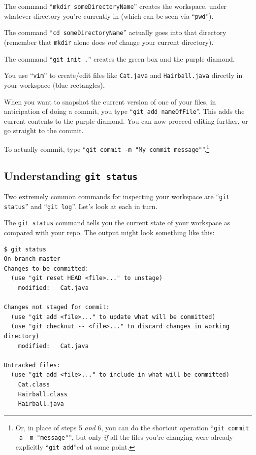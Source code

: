 \begin{compactenum}
\item The command ``\texttt{mkdir someDirectoryName}'' creates the workspace,
under whatever directory you're currently in (which can be seen via
``\texttt{pwd}'').
\item The command ``\texttt{cd someDirectoryName}'' actually goes into that
directory (remember that \texttt{mkdir} alone does \textit{not} change your
current directory).
\item The command ``\texttt{git init .}'' creates the green box and the purple
diamond.
\item You use ``\texttt{vim}'' to create/edit files like \texttt{Cat.java} and
\texttt{Hairball.java} directly in your workspace (blue rectangles).
\item When you want to snapshot the current version of one of your files, in
anticipation of doing a commit, you type ``\texttt{git add nameOfFile}''. This
adds the current contents to the purple diamond. You can now proceed editing
further, or go straight to the commit.

\item To actually commit, type ``\texttt{git commit -m "My commit
message"}''.\footnote{Or, in place of steps 5 \textit{and} 6, you can do the
shortcut operation ``\texttt{git commit -a -m "message"}'', but only
\textit{if} all the files you're changing were already explicitly
``\texttt{git add}''ed at some point.}

\end{compactenum}

\subsection{Understanding \texttt{git status}}

Two extremely common commands for inspecting your workspace are ``\texttt{git
status}'' and ``\texttt{git log}''. Let's look at each in turn.

The \texttt{git status} command tells you the current state of your workspace
as compared with your repo. The output might look something like this:

\begin{Verbatim}[fontsize=\scriptsize,samepage=true,frame=single]
$ git status
On branch master
Changes to be committed:
  (use "git reset HEAD <file>..." to unstage)
    modified:   Cat.java

Changes not staged for commit:
  (use "git add <file>..." to update what will be committed)
  (use "git checkout -- <file>..." to discard changes in working directory)
    modified:   Cat.java

Untracked files:
  (use "git add <file>..." to include in what will be committed)
    Cat.class
    Hairball.class
    Hairball.java
\end{Verbatim}


